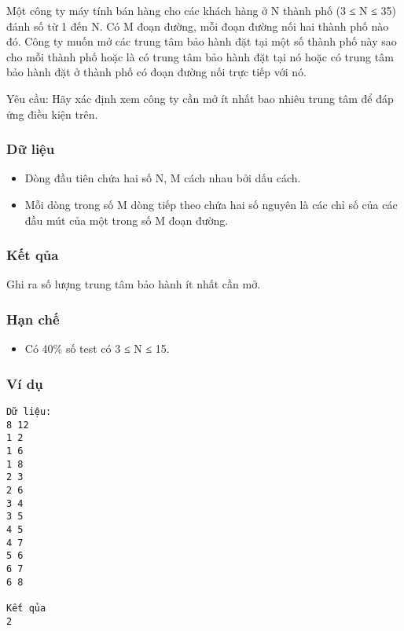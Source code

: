 



   Một công ty máy tính bán hàng cho các khách hàng ở N thành phố (3 ≤ N ≤ 35) đánh số từ 1 đến N. Có M đoạn đường, mỗi đoạn đường nối hai thành phố nào đó. Công ty muốn mở các trung tâm bảo hành đặt tại một số thành phố này sao cho mỗi thành phố hoặc là có trung tâm bảo hành đặt tại nó hoặc có trung tâm bảo hành đặt ở thành phố có đoạn đường nối trực tiếp với nó.  

   Yêu cầu: Hãy xác định xem công ty cần mở ít nhất bao nhiêu trung tâm để đáp ứng điều kiện trên.  

\subsubsection{   Dữ liệu  }
\begin{itemize}
	\item     Dòng đầu tiên chứa hai số N, M cách nhau bởi dấu cách.   
	\item     Mỗi dòng trong số M dòng tiếp theo chứa hai số nguyên là các chỉ số của các đầu mút của một trong số M đoạn đường.   
\end{itemize}

\subsubsection{   Kết qủa  }

   Ghi ra số lượng trung tâm bảo hành ít nhất cần mở.  

\subsubsection{   Hạn chế  }
\begin{itemize}
	\item     Có 40\% số test có 3 ≤ N ≤ 15.   
\end{itemize}

\subsubsection{   Ví dụ  }
\begin{verbatim}
Dữ liệu:
8 12
1 2
1 6
1 8
2 3
2 6
3 4
3 5
4 5
4 7
5 6
6 7
6 8

Kết qủa
2
\end{verbatim}